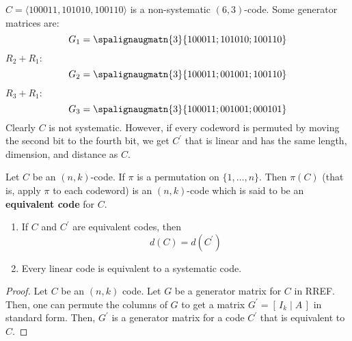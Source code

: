 \begin{exbox}
    \begin{example}
        $ C=\langle 100011,101010,100110\rangle $
        is a non-systematic $ (6,3) $-code.
        Some generator matrices are:
        \[ G_1=\spalignaugmatn{3}{
                1 0 0 0 1 1 ;
                1 0 1 0 1 0 ;
                1 0 0 1 1 0} \]
        $ R_2+R_1 $:
        \[ G_2=\spalignaugmatn{3}{
                1 0 0 0 1 1 ;
                0 0 1 0 0 1 ;
                1 0 0 1 1 0} \]
        $ R_3+R_1 $:
        \[ G_3=\spalignaugmatn{3}{
                1 0 0 0 1 1 ;
                0 0 1 0 0 1 ;
                0 0 0 1 0 1} \]
        Clearly $ C $ is not systematic. However, if every codeword
        is permuted by moving the second bit to the fourth bit, we get $ C^{\prime} $
        that is linear and has the same length, dimension, and distance as $ C $.
    \end{example}
\end{exbox}

\begin{defbox}
    \begin{definition}
        Let $ C $ be an $ (n,k) $-code. If $ \pi $ is a permutation on
        $ \{1,\ldots ,n\} $. Then $ \pi(C) $ (that is, apply $ \pi $ to each
        codeword) is an $ (n,k) $-code which is said to be an \textbf{equivalent code}
        for $ C $.
    \end{definition} \end{defbox}

\begin{thmbox}
    \begin{theorem}
        \begin{enumerate}[label=(\arabic*)]
            \item If $ C $ and $ C^{\prime} $ are equivalent codes, then
                  \[ d(C)=d(C^{\prime}) \]
            \item Every linear code is equivalent to a systematic code.
        \end{enumerate}
    \end{theorem} \end{thmbox}

\begin{proof}
    Let $ C $ be an $ (n,k) $ code. Let $ G $ be a generator matrix for $ C $
    in RREF\@. Then, one can permute the columns of $ G $ to get a matrix
    $ G^{\prime}=\left[ \,I_k\mid A\, \right] $ in standard form. Then,
    $ G^{\prime} $ is a generator matrix for a code $ C^{\prime} $ that is
    equivalent to $ C $.
\end{proof}

